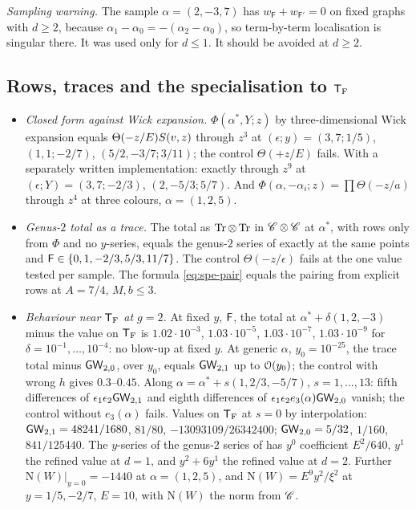 \emph{Sampling warning.} The sample $\alpha=(2,-3,7)$ has $w_{\mathsf{F}}+w_{\mathsf{F}'}=0$ on fixed graphs with $d\geq 2$, because $\alpha_1-\alpha_0=-(\alpha_2-\alpha_0)$, so term-by-term localisation is singular there. It was used only for $d\leq 1$. It should be avoided at $d\geq 2$.

\subsection{Rows, traces and the specialisation to \texorpdfstring{$\mathsf{T}_{\mathrm{F}}$}{TF}}
\label{sec:evi-spe}

\begin{itemize}
\item \emph{Closed form against Wick expansion.} $\Phi(\alpha^*,Y;z)$ by three-dimensional Wick expansion equals $\Theta(-z/E)S(v,z)$ through $z^3$ at $(\epsilon;y)=(3,7;1/5)$, $(1,1;-2/7)$, $(5/2,-3/7;3/11)$; the control $\Theta(+z/E)$ fails. With a separately written implementation: exactly through $z^9$ at $(\epsilon;Y)=(3,7;-2/3)$, $(2,-5/3;5/7)$. And $\Phi(\alpha,-\alpha_i;z)=\prod\Theta(-z/a)$ through $z^4$ at three colours, $\alpha=(1,2,5)$.
\item \emph{Genus-$2$ total as a trace.} The total as $\operatorname{Tr}\otimes\operatorname{Tr}$ in $\mathscr{C}\otimes\mathscr{C}$ at $\alpha^*$, with rows only from $\Phi$ and no $y$-series, equals the genus-$2$ series of \cite{BS} exactly at the same points and $\mathsf{F}\in\{0,1,-2/3,5/3,11/7\}$. The control $\Theta(-z/\epsilon)$ fails at the one value tested per sample. The formula \cref{eq:spe-pair} equals the pairing from explicit rows at $A=7/4$, $M,b\leq 3$.
\item \emph{Behaviour near $\mathsf{T}_{\mathrm{F}}$ at $g=2$.} At fixed $y$, $\mathsf{F}$, the total at $\alpha^*+\delta(1,2,-3)$ minus the value on $\mathsf{T}_{\mathrm{F}}$ is $1.02\cdot 10^{-3}$, $1.03\cdot 10^{-5}$, $1.03\cdot 10^{-7}$, $1.03\cdot 10^{-9}$ for $\delta=10^{-1},\dots,10^{-4}$: no blow-up at fixed $y$. At generic $\alpha$, $y_0=10^{-25}$, the trace total minus $\mathsf{GW}_{2,0}$, over $y_0$, equals $\mathsf{GW}_{2,1}$ up to $\mathcal{O}(y_0)$; the control with wrong $h$ gives $0.3$--$0.45$. Along $\alpha=\alpha^*+s(1,2/3,-5/7)$, $s=1,\dots,13$: fifth differences of $\epsilon_1\epsilon_2\mathsf{GW}_{2,1}$ and eighth differences of $\epsilon_1\epsilon_2e_3(\alpha)\mathsf{GW}_{2,0}$ vanish; the control without $e_3(\alpha)$ fails. Values on $\mathsf{T}_{\mathrm{F}}$ at $s=0$ by interpolation: $\mathsf{GW}_{2,1}=48241/1680$, $81/80$, $-13093109/26342400$; $\mathsf{GW}_{2,0}=5/32$, $1/160$, $841/125440$. The $y$-series of the genus-$2$ series of \cite{BS} has $y^0$ coefficient $E^2/640$, $y^1$ the refined value at $d=1$, and $y^2+6y^1$ the refined value at $d=2$. Further $\mathrm{N}(W)|_{y=0}=-1440$ at $\alpha=(1,2,5)$, and $\mathrm{N}(W)=E^9y^2/\xi^2$ at $y=1/5,-2/7$, $E=10$, with $\mathrm{N}(W)$ the norm from $\mathscr{C}$.

\end{itemize}
